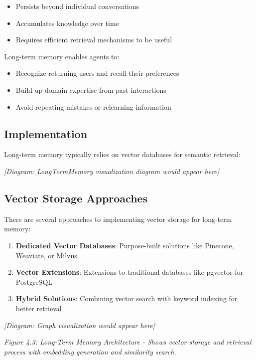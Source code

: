 \documentclass[11pt,oneside]{book}
\providecommand{\tightlist}{%
  \setlength{\itemsep}{0pt}\setlength{\parskip}{0pt}}
\begin{document}
\begin{itemize}
\tightlist
\item
  Persists beyond individual conversations
\item
  Accumulates knowledge over time
\item
  Requires efficient retrieval mechanisms to be useful
\end{itemize}

Long-term memory enables agents to:

\begin{itemize}
\tightlist
\item
  Recognize returning users and recall their preferences
\item
  Build up domain expertise from past interactions
\item
  Avoid repeating mistakes or relearning information
\end{itemize}

\subsection{Implementation}\label{implementation-1}

Long-term memory typically relies on vector databases for semantic
retrieval:

\emph{{[}Diagram: LongTermMemory visualization diagram would appear
here{]}}

\subsection{Vector Storage Approaches}\label{vector-storage-approaches}

There are several approaches to implementing vector storage for
long-term memory:

\begin{enumerate}
\def\labelenumi{\arabic{enumi}.}
\tightlist
\item
  \textbf{Dedicated Vector Databases}: Purpose-built solutions like
  Pinecone, Weaviate, or Milvus
\item
  \textbf{Vector Extensions}: Extensions to traditional databases like
  pgvector for PostgreSQL
\item
  \textbf{Hybrid Solutions}: Combining vector search with keyword
  indexing for better retrieval
\end{enumerate}

\emph{{[}Diagram: Graph visualization would appear here{]}}

\emph{Figure 4.3: Long-Term Memory Architecture - Shows vector storage
and retrieval process with embedding generation and similarity search.}
\end{document}
